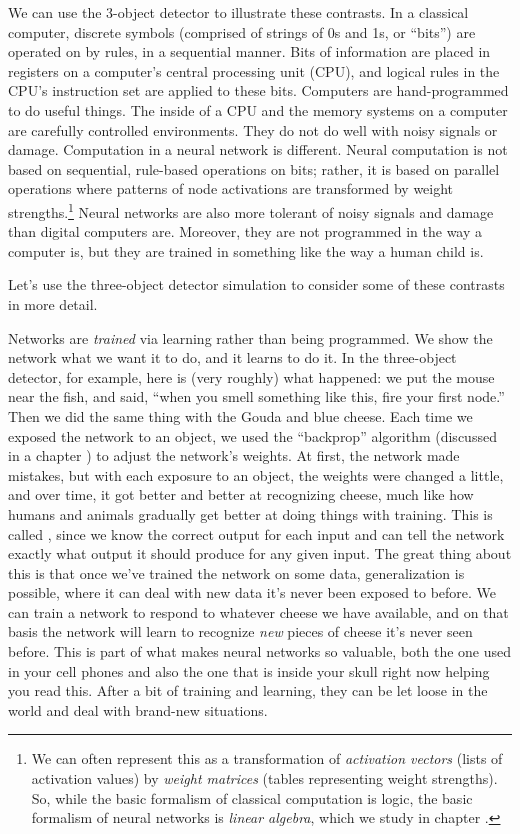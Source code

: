 We can use the 3-object detector to illustrate these contrasts. In a classical computer, discrete symbols (comprised of strings of 0s and 1s, or ``bits'') are operated on by rules, in a sequential manner. Bits of information are placed in registers on a computer's central processing unit (CPU), and logical rules in the CPU's instruction set are applied to these bits. Computers are hand-programmed to do useful things. The inside of a CPU and the memory systems on a computer are carefully controlled environments. They do not do well with noisy signals or damage. Computation in a neural network is  different. Neural computation is not based on sequential, rule-based operations on bits; rather, it is based on parallel operations where patterns of node activations are transformed by weight strengths.\footnote{We can often represent this as a transformation of \emph{activation vectors} (lists of activation values) by \emph{weight matrices} (tables representing weight strengths). So, while the basic formalism of classical computation is logic,  the basic formalism of neural networks is \emph{linear algebra}, which we study in chapter .}  Neural networks are also more tolerant of noisy signals and damage than digital computers are. Moreover, they are not programmed in the way a computer is, but they are trained in something like the way a human child is.

Let's use the three-object detector simulation to consider some of these contrasts in more detail. 

Networks are \emph{trained} via learning rather than being programmed. We show the network what we want it to do, and it learns to do it. In the three-object detector, for example, here is (very roughly) what happened: we put the mouse near the fish, and said, ``when you smell something like this, fire your first node.''  Then we did the same thing with the Gouda and blue cheese. Each time we exposed the network to an object, we used the ``backprop'' algorithm (discussed in a chapter ) to adjust the network's weights. At first, the network made mistakes, but with each exposure to an object, the weights were changed a little, and over time, it got better and better at recognizing cheese, much like how humans and animals gradually get better at doing things with training. This is called , since we know the correct output for each input and can tell the network exactly what output it should produce for any given input. The great thing about this is that once we've trained the network on some data, generalization is possible, where it can deal with new data it's never been exposed to before. We can train a network to respond to whatever cheese we have available, and on that basis the network will learn to recognize \emph{new} pieces of cheese it's never seen before. This is part of what makes neural networks so valuable, both the one used in your cell phones and also the one that is inside your skull right now helping you read this. After a bit of training and learning, they can be let loose in the world and deal with brand-new situations.

